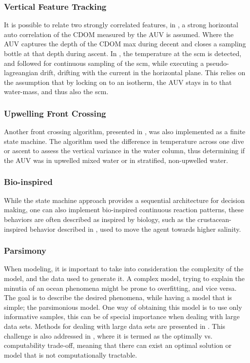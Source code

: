 \subsubsection*{Vertical Feature Tracking}
It is possible to relate two strongly correlated features, in \textcite{zhang2011peak}, a strong horizontal auto correlation of the CDOM measured by the AUV is assumed. Where the AUV captures the depth of the CDOM max during decent and closes a sampling bottle at that depth during ascent. In \textcite{zhang2019autonomous}, the temperature at the \acrfull{scm} is detected, and followed for continuous sampling of the \acrshort{scm}, while executing a pseudo-lagreangian drift, drifting with the current in the horizontal plane. This relies on the assumption that by locking on to an isotherm, the AUV stays in to that water-mass, and thus also the \acrshort{scm}. 


\subsubsection*{Upwelling Front Crossing}
Another front crossing algorithm, presented in \cite{zhang2012autonomous,zhang2013two,zhang2016autonomous}, was also implemented as a finite state machine. The algorithm used the difference in temperature across one dive or ascent to assess the vertical variance in the water column, thus determining if the AUV was in upwelled mixed water or in stratified, non-upwelled water. 
\subsubsection*{Bio-inspired}
While the state machine approach provides a sequential architecture for decision making, one can also implement bio-inspired continuous reaction patterns, these behaviors are  often described as inspired by biology, such as the crustacean-inspired behavior described in \cite{hwang2019auv}, used to move the agent towards higher salinity.  


\subsubsection*{Parsimony}
When modeling, it is important to take into consideration the complexity of the model, and the data used to generate it. A complex model, trying to explain the minutia of an ocean phenomena might be prone to overfitting, and vice versa. The goal is to describe the desired phenomena, while having a model that is simple; the parsimonious model. One way of obtaining this model is to use only informative samples, this can be of special importance when dealing with large data sets. Methods for dealing with large data sets are presented in \textcite{rasmussen2003gaussian}. This challenge is also addressed in \textcite{fossum2019adaptive}, where it is termed as the optimally vs. computability trade-off, meaning that there can exist an optimal solution or model that is not computationally tractable.

